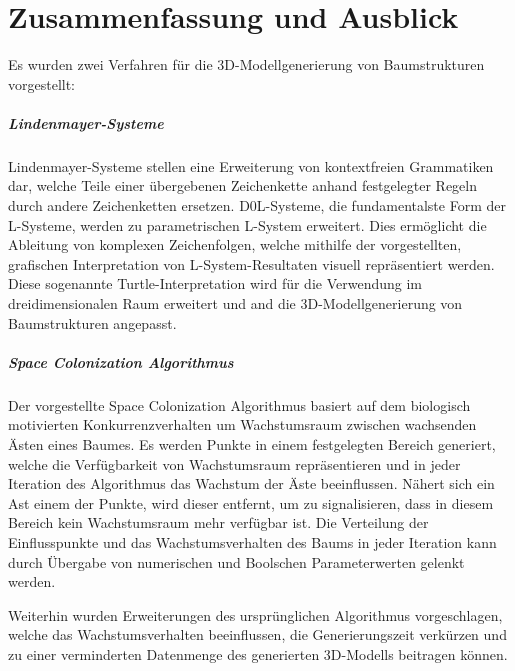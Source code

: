\chapter{Zusammenfassung und Ausblick}

Es wurden zwei Verfahren für die 3D-Modellgenerierung von Baumstrukturen vorgestellt:

\paragraph{Lindenmayer-Systeme}

Lindenmayer-Systeme stellen eine Erweiterung von kontextfreien Grammatiken dar, welche Teile einer übergebenen Zeichenkette anhand festgelegter Regeln durch andere Zeichenketten ersetzen. D0L-Systeme, die fundamentalste Form der L-Systeme, werden zu parametrischen L-System erweitert. \cite[S.3]{ABOP:04} Dies ermöglicht die Ableitung von komplexen Zeichenfolgen, welche mithilfe der vorgestellten, grafischen Interpretation von L-System-Resultaten visuell repräsentiert werden. Diese sogenannte Turtle-Interpretation wird für die Verwendung im dreidimensionalen Raum erweitert und and die 3D-Modellgenerierung von Baumstrukturen angepasst. \cite[S.7, 18f, 21ff, 51ff]{ABOP:04}

\paragraph{Space Colonization Algorithmus}

Der vorgestellte Space Colonization Algorithmus basiert auf dem biologisch motivierten Konkurrenzverhalten um Wachstumsraum zwischen wachsenden Ästen eines Baumes. Es werden Punkte in einem festgelegten Bereich generiert, welche die Verfügbarkeit von Wachstumsraum repräsentieren und in jeder Iteration des Algorithmus das Wachstum der Äste beeinflussen. Nähert sich ein Ast einem der Punkte, wird dieser entfernt, um zu signalisieren, dass in diesem Bereich kein Wachstumsraum mehr verfügbar ist. \cite[S.2f]{SpaceColonizationAlgorithm:07} Die Verteilung der Einflusspunkte und das Wachstumsverhalten des Baums in jeder Iteration kann durch Übergabe von numerischen und Boolschen Parameterwerten gelenkt werden. \cite[S.5]{SpaceColonizationAlgorithm:07} 

Weiterhin wurden Erweiterungen des ursprünglichen Algorithmus vorgeschlagen, welche das Wachstumsverhalten beeinflussen, die Generierungszeit verkürzen und zu einer verminderten Datenmenge des generierten 3D-Modells beitragen können.

